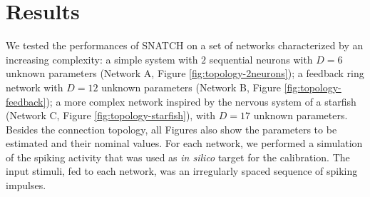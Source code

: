 \documentclass[utf8]{frontiersFPHY} %
\newcommand {\name}{SNATCH}
\begin{document}
\section{Results}
\label{sec:results}


We tested the performances of \name{} on a set of networks characterized by an increasing complexity: a simple system with $2$ sequential neurons with $D=6$ unknown parameters (Network A, Figure \ref{fig:topology-2neurons}); a feedback ring network with $D=12$ unknown parameters (Network B, Figure \ref{fig:topology-feedback}); a more complex network inspired by the nervous system of a starfish (Network C, Figure \ref{fig:topology-starfish}), with $D=17$ unknown parameters.
Besides the connection topology, all Figures also show the parameters to be estimated and their nominal values.
For each network, we performed a simulation of the spiking activity that was used as \emph{in silico} target for the calibration.
The input stimuli, fed to each network, was an irregularly spaced sequence of spiking impulses.
\end{document}
